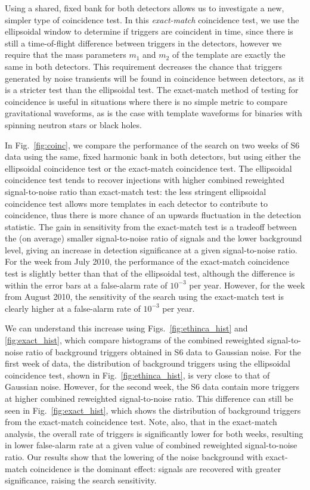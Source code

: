 \documentclass[12pt]{iopart} \usepackage{graphicx,amssymb}
\begin{document}
Using a shared, fixed bank for both detectors allows us to investigate a
new, simpler type of coincidence test. In this \emph{exact-match} coincidence
test, we use the ellipsoidal window to determine if triggers are coincident in
time, since there is still a time-of-flight difference between triggers in the
detectors, however we require that the mass parameters $m_1$ and $m_2$ of the
template are exactly the same in both detectors. 
This requirement
decreases the chance that triggers generated by noise
transients will be found in coincidence between detectors, as it is a stricter
test than the ellipsoidal test.
The exact-match method of testing for coincidence
is useful in situations where there is no simple metric to compare
gravitational waveforms, as is the case with template waveforms for binaries
with spinning neutron stars or black holes\cite{Canton:2014ena}.

In Fig.~\ref{fig:coinc}, we compare the performance of the search on two weeks
of S6 data using the same, fixed harmonic bank in both detectors, but using
either the ellipsoidal coincidence test or the exact-match coincidence test.
The ellipsoidal coincidence test tends to recover injections with higher
combined reweighted signal-to-noise ratio than exact-match test: the less
stringent ellipsoidal coincidence test allows more templates in each detector
to contribute to coincidence, thus there is more chance of an upwards
fluctuation in the detection statistic.  The gain in sensitivity from the
exact-match test is a tradeoff between the (on average) smaller
signal-to-noise ratio of signals and the lower background level, giving an
increase in detection significance at a given signal-to-noise ratio.  For the
week from July 2010, the performance of the exact-match coincidence test is
slightly better than that of the ellipsoidal test, although the difference is
within the error bars at a false-alarm rate of $10^{-3}$ per year.  However,
for the week from August 2010, the sensitivity of the search using the 
exact-match test is clearly higher at a false-alarm rate of $10^{-3}$ per year. 

We can understand this increase using Figs.~\ref{fig:ethinca_hist} and 
\ref{fig:exact_hist},
which compare histograms of the combined reweighted signal-to-noise ratio of
background triggers obtained in S6 data to Gaussian noise. For the first week of
data, the distribution of background triggers using the ellipsoidal
coincidence test, shown in Fig.~\ref{fig:ethinca_hist}, is very close to that
of Gaussian noise. However, for the second week, the S6 data contain more
triggers at higher combined reweighted signal-to-noise ratio. This difference
can still be seen in Fig.~\ref{fig:exact_hist}, which shows the distribution
of background triggers from the exact-match coincidence test.  Note, also, 
that in the exact-match analysis, the overall rate of triggers is significantly
lower for both weeks, resulting in lower false-alarm rate at a given value of 
combined reweighted signal-to-noise ratio.  Our results show that the lowering
of the noise background with exact-match coincidence is the dominant effect: 
signals are recovered with greater significance, raising the search sensitivity.
 
\end{document}
